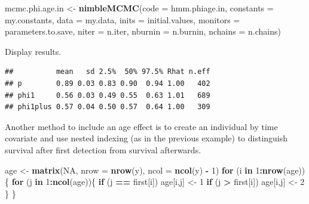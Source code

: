 \documentclass[
  12pt,
]{krantz}
\newenvironment{Shaded}{\begin{snugshade}}{\end{snugshade}}
\newcommand{\AttributeTok}[1]{\textcolor[rgb]{0.13,0.29,0.53}{#1}}
\newcommand{\ConstantTok}[1]{\textcolor[rgb]{0.56,0.35,0.01}{#1}}
\newcommand{\ControlFlowTok}[1]{\textcolor[rgb]{0.13,0.29,0.53}{\textbf{#1}}}
\newcommand{\DecValTok}[1]{\textcolor[rgb]{0.00,0.00,0.81}{#1}}
\newcommand{\FunctionTok}[1]{\textcolor[rgb]{0.13,0.29,0.53}{\textbf{#1}}}
\newcommand{\NormalTok}[1]{#1}
\newcommand{\OtherTok}[1]{\textcolor[rgb]{0.56,0.35,0.01}{#1}}
\newcommand{\SpecialCharTok}[1]{\textcolor[rgb]{0.81,0.36,0.00}{\textbf{#1}}}
\begin{document}
\begin{Shaded}
\begin{Highlighting}[]
\NormalTok{mcmc.phi.age.in }\OtherTok{\textless{}{-}} \FunctionTok{nimbleMCMC}\NormalTok{(}\AttributeTok{code =}\NormalTok{ hmm.phiage.in, }
                             \AttributeTok{constants =}\NormalTok{ my.constants,}
                             \AttributeTok{data =}\NormalTok{ my.data,              }
                             \AttributeTok{inits =}\NormalTok{ initial.values,}
                             \AttributeTok{monitors =}\NormalTok{ parameters.to.save,}
                             \AttributeTok{niter =}\NormalTok{ n.iter,}
                             \AttributeTok{nburnin =}\NormalTok{ n.burnin, }
                             \AttributeTok{nchains =}\NormalTok{ n.chains)}
\end{Highlighting}
\end{Shaded}

Display results.

\begin{verbatim}
##          mean   sd 2.5%  50% 97.5% Rhat n.eff
## p        0.89 0.03 0.83 0.90  0.94 1.00   402
## phi1     0.56 0.03 0.49 0.55  0.63 1.01   689
## phi1plus 0.57 0.04 0.50 0.57  0.64 1.00   309
\end{verbatim}

Another method to include an age effect is to create an individual by time covariate and use nested indexing (as in the previous example) to distinguish survival after first detection from survival afterwards.

\begin{Shaded}
\begin{Highlighting}[]
\NormalTok{age }\OtherTok{\textless{}{-}} \FunctionTok{matrix}\NormalTok{(}\ConstantTok{NA}\NormalTok{, }\AttributeTok{nrow =} \FunctionTok{nrow}\NormalTok{(y), }\AttributeTok{ncol =} \FunctionTok{ncol}\NormalTok{(y) }\SpecialCharTok{{-}} \DecValTok{1}\NormalTok{)}
\ControlFlowTok{for}\NormalTok{ (i }\ControlFlowTok{in} \DecValTok{1}\SpecialCharTok{:}\FunctionTok{nrow}\NormalTok{(age))\{}
  \ControlFlowTok{for}\NormalTok{ (j }\ControlFlowTok{in} \DecValTok{1}\SpecialCharTok{:}\FunctionTok{ncol}\NormalTok{(age))\{}
    \ControlFlowTok{if}\NormalTok{ (j }\SpecialCharTok{==}\NormalTok{ first[i]) age[i,j] }\OtherTok{\textless{}{-}} \DecValTok{1}
    \ControlFlowTok{if}\NormalTok{ (j }\SpecialCharTok{\textgreater{}}\NormalTok{ first[i]) age[i,j] }\OtherTok{\textless{}{-}} \DecValTok{2}
\NormalTok{  \}}
\NormalTok{\}}
\end{Highlighting}
\end{Shaded}
\end{document}
